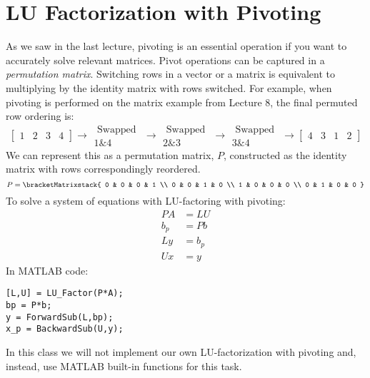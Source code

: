 \section{LU Factorization with Pivoting}
As we saw in the last lecture, pivoting is an essential operation if you want to accurately solve relevant matrices. Pivot operations can be captured in a \emph{permutation matrix}.  Switching rows in a vector or a matrix is equivalent to multiplying by the identity matrix with rows switched.  For example, when pivoting is performed on the matrix example from Lecture 8, the final permuted row ordering is: 
\begin{equation*}
\left[ \begin{matrix} 1 & 2 & 3 & 4 \end{matrix} \right] \rightarrow \substack{\text{ Swapped } \\ \text{1\&4}} \rightarrow \substack{\text{ Swapped } \\ \text{2\&3}} \rightarrow \substack{\text{ Swapped } \\ \text{3\&4}} \rightarrow \left[\begin{matrix}4 & 3 & 1 & 2 \end{matrix} \right]
\end{equation*}
We can represent this as a permutation matrix, $P$, constructed as the identity matrix with rows correspondingly reordered.
\begin{equation*}
P = 
\bracketMatrixstack{
0 & 0 & 0 & 1 \\
0 & 0 & 1 & 0 \\
1 & 0 & 0 & 0 \\
0 & 1 & 0 & 0
}
\end{equation*}
To solve a system of equations with LU-factoring with pivoting:
\begin{align*}
PA &= LU \\
b_p &= Pb \\
Ly &= b_p \\
Ux &= y
\end{align*}
In MATLAB code:
\begin{lstlisting}[style=myMatlab]
[L,U] = LU_Factor(P*A);
bp = P*b;
y = ForwardSub(L,bp);
x_p = BackwardSub(U,y);
\end{lstlisting}
In this class we will not implement our own LU-factorization with pivoting and, instead, use MATLAB built-in functions for this task.
